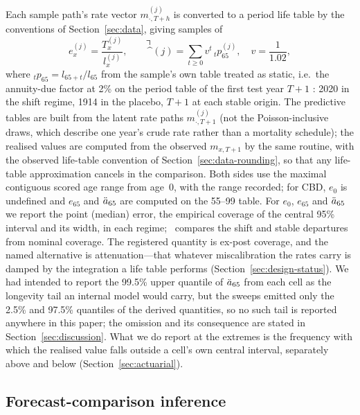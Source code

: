 Each sample path's rate vector $m^{(j)}_{\cdot,T+h}$ is converted to a period
life table by the conventions of Section~\ref{sec:data}, giving samples of
\begin{equation}
  e^{(j)}_x = \frac{T^{(j)}_x}{l^{(j)}_x},\qquad
  \annuity^{(j)} = \sum_{t\ge0} v^{t}\,{}_t p^{(j)}_{65},\quad v=\frac{1}{1.02},
\end{equation}
where ${}_t p_{65}=l_{65+t}/l_{65}$ from the sample's own table treated as
static, i.e.\ the annuity-due factor at 2\% on the period table of the
first test year $T+1$ \citep{dickson2020actuarial}: 2020 in the shift
regime, 1914 in the placebo, $T+1$ at each stable origin. The predictive
tables are built from the latent rate paths $m^{(j)}_{\cdot,T+1}$ (not the
Poisson-inclusive draws, which describe one year's crude rate rather than
a mortality schedule); the realised values are computed from the observed
$m_{x,T+1}$ by the same routine, with the observed life-table convention of
Section~\ref{sec:data-rounding}, so that any life-table approximation
cancels in the comparison. Both sides use the maximal contiguous scored age
range from age~0, with the range recorded; for CBD, $e_0$ is undefined and
$e_{65}$ and $\ddot{a}_{65}$ are computed on the 55--99 table. For $e_0$,
$e_{65}$ and $\ddot{a}_{65}$ we report the point (median) error, the empirical
coverage of the central 95\% interval and its width, in each regime;
\Hfive\ compares the shift and stable departures from nominal coverage.
The registered quantity is ex-post coverage, and the named alternative is
attenuation---that whatever miscalibration the rates carry is damped by the
integration a life table performs (Section~\ref{sec:design-status}). We had
intended to report the 99.5\% upper quantile of $\ddot{a}_{65}$ from each cell as
the longevity tail an internal model would carry, but the sweeps emitted
only the 2.5\% and 97.5\% quantiles of the derived quantities, so no such
tail is reported anywhere in this paper; the omission and its consequence
are stated in Section~\ref{sec:discussion}. What we do report at the
extremes is the frequency with which the realised value falls outside a
cell's own central interval, separately above and below
(Section~\ref{sec:actuarial}).

\subsection{Forecast-comparison inference}
\label{sec:metrics-inference}

